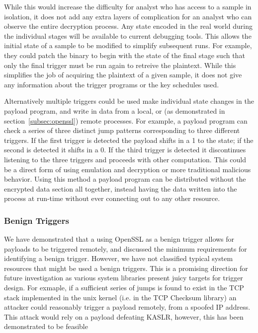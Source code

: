 While this would increase the difficulty for analyst  who has access
to a sample in isolation, it  does not add any extra layers of complication 
for an analyst who can observe the entire decryption process. Any state 
encoded in the real world during the individual stages will be available to current 
debugging tools. This allows the initial state of a sample to be modified
to simplify subsequent runs. For example, they could patch the 
binary to begin with the state of the final stage such that only the final 
trigger must be run again to retreive the plaintext. While this simplifies the 
job of acquiring the plaintext of a given \speculake sample, it does not give any 
information about the trigger programs or the key schedules used. 

\smallskip

Alternatively multiple triggers could be used make individual state changes in
the payload program, and write in data from a local, or (as demonstrated in 
section~\ref{subsec:openssl}) remote processes. For example, a payload program
can check a series of three distinct jump patterns corresponding to three different 
triggers. If the first trigger is detected the payload shifts in a 1 to the state; if
the second is detected it shifts in a 0. If the third trigger is detected it 
discontinues listening to the three triggers and proceeds with other computation. 
This could be a direct form of \speculake using emulation and decryption 
or more traditional malicious behavior. Using this method a payload program can
be distributed without the encrypted data section all together, instead having 
the data written into the process at run-time without ever connecting out to any 
other resource. 

\subsubsection{Benign Triggers}
We have demonstrated that a using OpenSSL as a benign trigger allows for 
\speculake payloads to be triggered remotely, and discussed the minimum 
requirements for identifying a benign trigger. However, we have not classified
typical system resources that might be used a benign triggers. This is a 
promising direction for future investigation as various system libraries present 
juicy targets for trigger design. For exmaple, if a sufficient series of jumps 
is found to exist in the TCP stack implemented in the unix kernel (i.e. in the TCP
Checksum library) an attacker could reasonably trigger a \speculake payload remotely,
from a spoofed IP address. This attack would rely on a payload defeating KASLR, 
however, this has been demonstrated to be feasible~\cite{gruss2017kaslr,evtyushkin2016jump}

